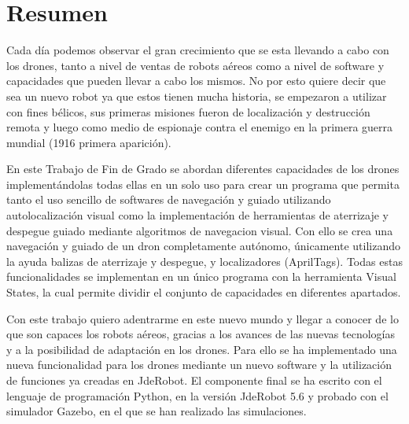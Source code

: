 \documentclass[a4paper, 12pt, oneside]{book}
\begin{document}
\chapter*{Resumen}
\hspace{1cm} Cada día podemos observar el gran crecimiento que se esta llevando a cabo con los drones, tanto a nivel de ventas de robots aéreos como a nivel de software y capacidades que pueden llevar a cabo los mismos. No por esto quiere decir que sea un nuevo robot ya que estos tienen mucha historia, se empezaron a utilizar con fines bélicos, sus primeras misiones fueron de localización y destrucción remota y luego como medio de espionaje contra el enemigo en la primera guerra mundial (1916 primera aparición).

\hspace{1cm} En este Trabajo de Fin de Grado se abordan diferentes capacidades de los drones implementándolas todas ellas en un solo uso para crear un programa que permita tanto el uso sencillo de softwares de navegación y guiado utilizando autolocalización visual como la implementación de herramientas de aterrizaje y despegue guiado mediante algoritmos de navegacion visual. Con ello se crea una navegación y guiado de un dron completamente autónomo, únicamente utilizando la ayuda balizas de aterrizaje y despegue, y localizadores (AprilTags). Todas estas funcionalidades se implementan en un único programa con la herramienta Visual States, la cual permite dividir el conjunto de capacidades en diferentes apartados.

\hspace{1cm} Con este trabajo quiero adentrarme en este nuevo mundo y llegar a conocer de lo que son capaces los robots aéreos, gracias a los avances de las nuevas tecnologías y a la posibilidad de adaptación en los drones. Para ello se ha implementado una nueva funcionalidad para los drones mediante un nuevo software y la utilización de funciones ya creadas en JdeRobot. El componente final se ha escrito con el lenguaje de programación Python, en la versión JdeRobot 5.6 y probado con el simulador Gazebo, en el que se han realizado las simulaciones.

\renewcommand{\tablename}{Tabla}
\tableofcontents %

\listoffigures %
\cleardoublepage

\pagestyle{fancy}
\setlength{\parindent}{6mm}







\end{document}
